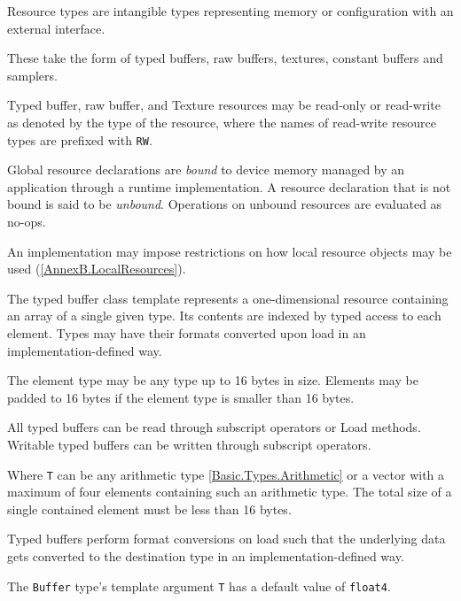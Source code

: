 
\p Resource types are intangible types representing memory or configuration with an external interface.

\p These take the form of typed buffers, raw buffers, textures, constant buffers
and samplers.

\p Typed buffer, raw buffer, and Texture resources may be read-only or
read-write as denoted by the type of the resource, where the names of read-write
resource types are prefixed with \texttt{RW}.

\p Global resource declarations are \textit{bound} to device memory managed by
an application through a runtime implementation. A resource declaration that is
not bound is said to be \textit{unbound}. Operations on unbound resources are
evaluated as no-ops.

\p An implementation may impose restrictions on how local resource objects may
be used (\ref{AnnexB.LocalResources}).


\p The typed buffer class template represents a one-dimensional resource
containing an array of a single given type. Its contents are indexed by typed
access to each element. Types may have their formats converted upon load in an
implementation-defined way.

\p The element type may be any type up to 16 bytes in size. Elements may be
padded to 16 bytes if the element type is smaller than 16 bytes.

\p All typed buffers can be read through subscript operators or Load methods.
Writable typed buffers can be written through subscript operators.

\p Where \texttt{T} can be any arithmetic type \ref{Basic.Types.Arithmetic}
or a vector with a maximum of four elements containing such an arithmetic type.
The total size of a single contained element must be less than 16 bytes.

\p Typed buffers perform format conversions on load such that the underlying
data gets converted to the destination type in an implementation-defined way.

\p The \texttt{Buffer} type's template argument \texttt{T} has a default value
of \texttt{float4}.

